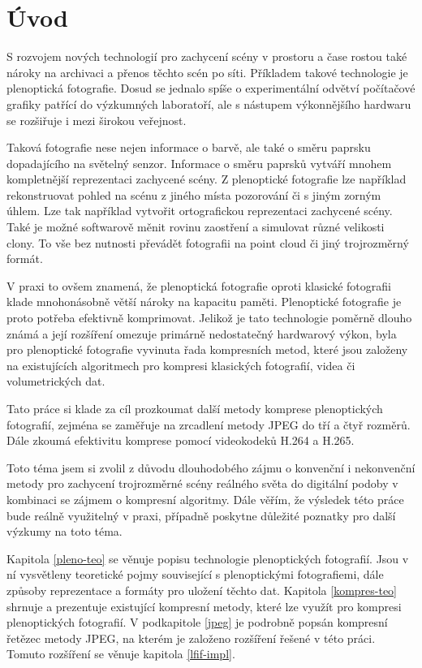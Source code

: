 
\chapter{Úvod}
S rozvojem nových technologií pro zachycení scény v prostoru a čase rostou také nároky na archivaci a přenos těchto scén po síti.
Příkladem takové technologie je plenoptická fotografie.
Dosud se jednalo spíše o experimentální odvětví počítačové grafiky patřící do výzkumných laboratoří, ale s nástupem výkonnějšího hardwaru se rozšiřuje i mezi širokou veřejnost.

Taková fotografie nese nejen informace o barvě, ale také o směru paprsku dopadajícího na světelný senzor.
Informace o směru paprsků vytváří mnohem kompletnější reprezentaci zachycené scény.
Z plenoptické fotografie lze například rekonstruovat pohled na scénu z jiného místa pozorování či s jiným zorným úhlem.
Lze tak například vytvořit ortografickou reprezentaci zachycené scény.
Také je možné softwarově měnit rovinu zaostření a simulovat různé velikosti clony.
To vše bez nutnosti převádět fotografii na point cloud či jiný trojrozměrný formát.

V praxi to ovšem znamená, že plenoptická fotografie oproti klasické fotografii klade mnohonásobně větší nároky na kapacitu paměti.
Plenoptické fotografie je proto potřeba efektivně komprimovat.
Jelikož je tato technologie poměrně dlouho známá a její rozšíření omezuje primárně nedostatečný hardwarový výkon, byla pro plenoptické fotografie vyvinuta řada kompresních metod, které jsou založeny na existujících algoritmech pro kompresi klasických fotografií, videa či volumetrických dat.

Tato práce si klade za cíl prozkoumat další metody komprese plenoptických fotografií, zejména se zaměřuje na zrcadlení metody JPEG do tří a čtyř rozměrů.
Dále zkoumá efektivitu komprese pomocí videokodeků H.264 a H.265.

Toto téma jsem si zvolil z důvodu dlouhodobého zájmu o konvenční i nekonvenční metody pro zachycení trojrozměrné scény reálného světa do digitální podoby v kombinaci se zájmem o kompresní algoritmy.
Dále věřím, že výsledek této práce bude reálně využitelný v praxi, případně poskytne důležité poznatky pro další výzkumy na toto téma.

Kapitola \ref{pleno-teo} se věnuje popisu technologie plenoptických fotografií.
Jsou v ní vysvětleny teoretické pojmy související s plenoptickými fotografiemi, dále způsoby reprezentace a formáty pro uložení těchto dat.
Kapitola \ref{kompres-teo} shrnuje a prezentuje existující kompresní metody, které lze využít pro kompresi plenoptických fotografií.
V podkapitole \ref{jpeg} je podrobně popsán kompresní řetězec metody JPEG, na kterém je založeno rozšíření řešené v této práci.
Tomuto rozšíření se věnuje kapitola \ref{lfif-impl}.



